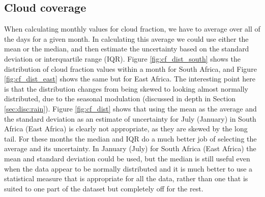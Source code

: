 \subsection{Cloud coverage}
\label{sec:disc:cc}
When calculating monthly values for cloud fraction, we have to average
over all of the days for a given month. In calculating this average we
could use either the mean or the median, and then estimate the
uncertainty based on the standard deviation or interquartile range
(IQR). Figure \ref{fig:cf_dist_south} shows the distribution of cloud
fraction values within a month for South Africa, and Figure
\ref{fig:cf_dist_east} shows the same but for East Africa. The
interesting point here is that the distribution changes from being
skewed to looking almost normally distributed, due to the seasonal
modulation (discussed in depth in Section \ref{sec:disc:rain}). Figure
\ref{fig:cf_dist} shows that using the mean as the average and the
standard deviation as an estimate of uncertainty for July (January) in
South Africa (East Africa) is clearly not appropriate, as they are
skewed by the long tail. For these months the median and IQR do a much
better job of selecting the average and its uncertainty. In January
(July) for South Africa (East Africa) the mean and standard deviation
could be used, but the median is still useful even when the data
appear to be normally distributed and it is much better to use a
statistical measure that is appropriate for all the data, rather than
one that is suited to one part of the dataset but completely off for
the rest.
